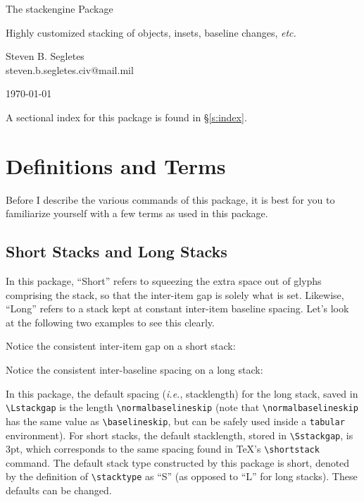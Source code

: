 \documentclass{article}
\def\rl{\rule[-.3pt]{2ex}{.6pt}}
\def\ste{\textsf{stackengine}}
\let\vb\verb
\begin{document}
\begin{center}
\LARGE The {\ste} Package\\
\rule{0em}{.7em}\small Highly customized stacking of objects, insets,
baseline changes, \textit{etc.}\\
\rule{0em}{2.7em}\large Steven B. Segletes\\
steven.b.segletes.civ@mail.mil\\
\rule{0em}{1.7em}\today\\
\stackengineversionnumber%
\end{center}


\sffamily%
A sectional index for this package is found in \S\ref{s:index}.

\rmfamily%

\section{Definitions and Terms}

Before I describe the various commands of this package, it is best for
you to familiarize yourself with a few terms as used in this package.

\subsection{Short Stacks and Long Stacks\label{s:st}}
\def\stacktype{L}
\Huge{}
\normalsize 

In this package, ``Short'' refers to squeezing the extra space out of
glyphs comprising the stack, so that the inter-item gap is solely what
is set.  Likewise, ``Long'' refers to a stack kept at constant
inter-item baseline spacing.  Let's look at the following two
examples to see this clearly.

Notice the consistent inter-item gap on a short stack: 
\Huge
{}%
{\quad{}}
\normalsize

Notice the consistent inter-baseline spacing on a long stack: 
\Huge
\Longstack{{{\rl t}} {{\rl y}} {{\rl k}} {{\rl e}}}%
{\quad{}}
\normalsize\\

\begin{sloppypar}
In this package, the default spacing (\textit{i.e.}, stacklength) for
the long stack, saved in \vb|\Lstackgap| is the length
\vb|\normalbaselineskip| (note that \vb|\normalbaselineskip| has the same 
value as \vb|\baselineskip|, but can be safely used inside a \vb|tabular|
environment).
For short stacks, the default stacklength, stored in
\vb|\Sstackgap|, is 3pt, which corresponds to the same spacing found in
\TeX's \vb|\shortstack| command.  The default stack type constructed by
this package is short, denoted by the definition of \vb|\stacktype| as
``S'' (as opposed to ``L'' for long stacks).  These defaults can be
changed.
\end{sloppypar}
\end{document}
